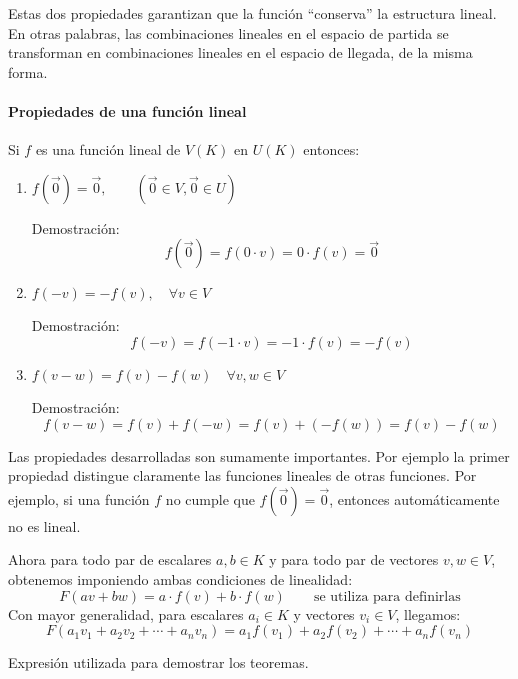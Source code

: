 Estas dos propiedades garantizan que la función ``conserva'' la estructura lineal. En otras palabras, las combinaciones lineales en el espacio de partida se transforman en combinaciones lineales en el espacio de llegada, de la misma forma.

\paragraph{Propiedades de una función lineal}

Si \(f\) es una función lineal de \(V(K)\) en \(U(K)\) entonces:
\begin{enumerate}
  \item \(f\left(\vec{0}\right) = \vec{0}, \qquad \left(\vec{0} \in V,\vec{0} \in U\right)\)

  Demostración:\[
    f\left(\vec{0}\right) = f\left(0 \cdot v\right) = 0 \cdot f(v) = \vec{0}
  \]
  \item \(f(-v)=-f(v), \quad \forall v \in V\)
  
  Demostración: \[
    f(-v) = f(-1 \cdot v) = -1 \cdot f(v) = -f(v)
  \]
  \item \(f(v-w)=f(v) - f(w) \quad \forall v,w \in V\)
  
  Demostración: \[
    f(v-w) = f(v) + f(-w) = f(v) + (-f(w)) = f(v) - f(w)
  \]
\end{enumerate}

\begin{tcolorbox}[interesting_data, title=Nota conceptual]
  Las propiedades desarrolladas son sumamente importantes. Por ejemplo la primer propiedad distingue claramente las funciones lineales de otras funciones. Por ejemplo, si una función \(f\) no cumple que \(f\left(\vec{0}\right) = \vec{0}\), entonces automáticamente no es lineal.
\end{tcolorbox}

Ahora para todo par de escalares \(a,b \in K\) y para todo par de vectores \(v,w \in V\), obtenemos imponiendo ambas condiciones de linealidad:
\[
  F(av + bw) = a\cdot f(v) + b\cdot f(w) \qquad \text{se utiliza para definirlas}
\]
Con mayor generalidad, para escalares \(a_i \in K\) y vectores \(v_i \in V\), llegamos:
\[
  F(a_1 v_1 + a_2 v_2 + \cdots + a_n v_n) = a_1 f(v_1) + a_2 f(v_2) + \cdots + a_n f(v_n)
\]
\begin{tcolorbox}[myconclusion]
  Expresión utilizada para demostrar los teoremas.
\end{tcolorbox}

